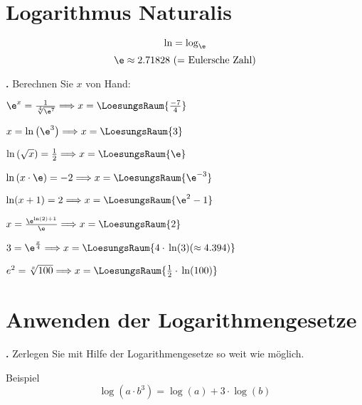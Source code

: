 \newpage

\section{Logarithmus Naturalis}

$$\ln = \log_{\e}$$
$$\e \approx 2.71828 \text{ (= Eulersche Zahl)}$$



\textbf{\bbwAufgabenNummer{}.}
Berechnen Sie $x$ von Hand:

\begin{bbwAufgabenBlock}
\item $\e^x = \frac1{\sqrt[4]{\e^7}}  \Longrightarrow x =    \LoesungsRaum{\frac{-7}4}$
\item $x = \ln\left(\e^3\right)  \Longrightarrow x =    \LoesungsRaum{3}$
\item $\ln\left(\sqrt{x}\right)  = \frac12  \Longrightarrow x =    \LoesungsRaum{\e}$
\item $\ln\left(x\cdot{} \e \right)  = -2  \Longrightarrow x =    \LoesungsRaum{\e^{-3}}$
\noTRAINER{\newpage}
\item $\ln(x+1) = 2 \Longrightarrow x =    \LoesungsRaum{\e^2 - 1}$
\item $x=\frac{\e^{\ln(2)+1}}{\e} \Longrightarrow x =    \LoesungsRaum{2}$
\item $3 = \e^{\frac{x}4} \Longrightarrow x=    \LoesungsRaum{4\cdot{} \ln(3) (\approx 4.394)}$
\item $e^2 = \sqrt[x]{100} \Longrightarrow x= \LoesungsRaum{\frac12\cdot{}\ln(100)}$
\end{bbwAufgabenBlock}

\newpage

\section{Anwenden der Logarithmengesetze}

\textbf{\bbwAufgabenNummer{}.}
Zerlegen Sie mit Hilfe der Logarithmengesetze so weit wie möglich.

Beispiel $$\log\left(a\cdot{}b^3\right) = \log(a) + 3\cdot{}\log(b)$$

